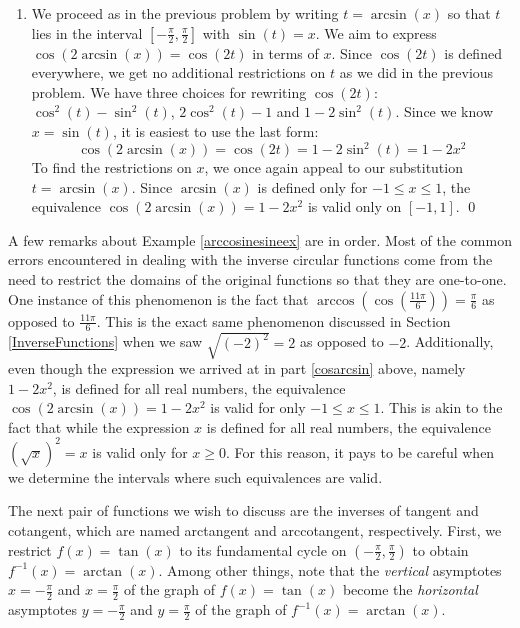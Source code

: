 \documentclass[12pt]{ximera}
\begin{document}
\begin{example}
\begin{enumerate}
\begin{enumerate}
\item We proceed as in the previous problem by writing $t = \arcsin(x)$ so that $t$ lies in the interval $\left[ -\frac{\pi}{2}, \frac{\pi}{2}\right]$ with $\sin(t) = x$.  We aim to express $\cos\left(2 \arcsin(x)\right) = \cos(2t)$ in terms of $x$.  Since $\cos(2t)$ is defined everywhere, we get no additional restrictions on $t$ as we did in the previous problem.  We have three choices for rewriting $\cos(2t)$:  $\cos^{2}(t) - \sin^{2}(t)$, $2\cos^{2}(t) - 1$ and $1 - 2\sin^{2}(t)$.  Since we know $x = \sin(t)$, it is easiest to use the last form: \[\cos\left(2 \arcsin(x)\right) = \cos(2t)  = 1 - 2\sin^{2}(t) = 1 - 2x^2\]  To find the restrictions on $x$, we once again appeal to our substitution $t = \arcsin(x)$.  Since $\arcsin(x)$ is defined only for $-1 \leq x \leq 1$, the equivalence $\cos\left(2 \arcsin(x)\right) = 1-2x^2$ is valid only on $[-1,1]$. \qed

\end{enumerate}

\end{enumerate}

\end{example}



A few remarks about Example \ref{arccosinesineex} are in order.  Most of the common errors encountered in dealing with the inverse circular functions come from the need to restrict the domains of the original functions so that they are one-to-one.  One instance of this phenomenon is the fact that $\arccos\left( \cos\left(\frac{11\pi}{6}\right)\right) = \frac{\pi}{6}$ as opposed to $\frac{11\pi}{6}$. This is the exact same phenomenon discussed in Section \ref{InverseFunctions} when we saw  $\sqrt{(-2)^2} = 2$ as opposed to $-2$.    Additionally, even though the expression we arrived at in part \ref{cosarcsin} above, namely $1 - 2x^2$, is defined for all real numbers, the equivalence  $\cos\left(2 \arcsin(x)\right) = 1-2x^2$ is valid for only $-1 \leq x \leq 1$.  This is akin to the fact that while the expression $x$ is defined for all real numbers, the equivalence $\left( \sqrt{x} \right)^2 = x$ is valid only for $x \geq 0$.  For this reason, it pays to be careful when we determine the intervals where such equivalences are valid.

\bigskip

The next pair of functions we wish to discuss are the inverses of tangent and cotangent, which are named arctangent and arccotangent, respectively.  First, we restrict $f(x) = \tan(x)$ to its fundamental cycle on $\left(-\frac{\pi}{2}, \frac{\pi}{2}\right)$ to obtain $f^{-1}(x) = \arctan(x)$. Among other things, note that the \textit{vertical} asymptotes $x = -\frac{\pi}{2}$ and $x = \frac{\pi}{2}$ of the graph of $f(x) = \tan(x)$ become the \textit{horizontal} asymptotes $y = -\frac{\pi}{2}$ and $y = \frac{\pi}{2}$ of the graph of $f^{-1}(x) = \arctan(x)$.  
\end{document}
